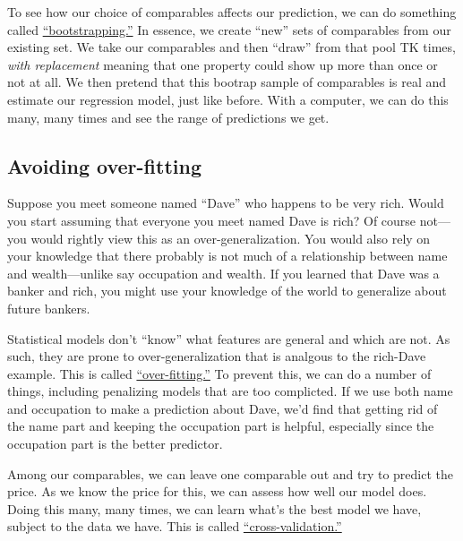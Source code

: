 \documentclass[
12pt, %
letterpaper, %
oneside, %
headinclude,footinclude, %
BCOR5mm, %
]{scrartcl}
\begin{document}
To see how our choice of comparables affects our prediction, we can do something called \href{https://en.wikipedia.org/wiki/Bootstrapping_(statistics)}{``bootstrapping.''}
In essence, we create ``new'' sets of comparables from our existing set.
We take our comparables and then ``draw'' from that pool TK times, \emph{with replacement} meaning that one property could show up more than once or not at all.
We then pretend that this bootrap sample of comparables is real and estimate our regression model, just like before.
With a computer, we can do this many, many times and see the range of predictions we get. 

\subsection{Avoiding over-fitting} \label{sec:regularization}
Suppose you meet someone named ``Dave'' who happens to be very rich.
Would you start assuming that everyone you meet named Dave is rich?
Of course not---you would rightly view this as an over-generalization.
You would also rely on your knowledge that there probably is not much of a relationship between name and wealth---unlike say occupation and wealth.
If you learned that Dave was a banker and rich, you might use your knowledge of the world to generalize about future bankers.

Statistical models don't ``know'' what features are general and which are not.
As such, they are prone to over-generalization that is analgous to the rich-Dave example. 
This is called \href{https://en.wikipedia.org/wiki/Overfitting}{``over-fitting.''}
To prevent this, we can do a number of things, including penalizing models that are too complicted.
If we use both name and occupation to make a prediction about Dave, we'd find that getting rid of the name part and keeping the occupation part is helpful, especially since the occupation part is the better predictor. 

Among our comparables, we can leave one comparable out and try to predict the price.
As we know the price for this, we can assess how well our model does.
Doing this many, many times, we can learn what's the best model we have, subject to the data we have.
This is called \href{https://en.wikipedia.org/wiki/Cross-validation_(statistics)}{``cross-validation.''}

\end{document}
